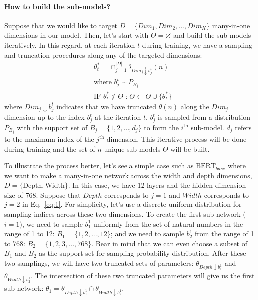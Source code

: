 \documentclass[letterpaper]{article} %
\begin{document}
\paragraph{How to build the sub-models?} Suppose that we would like to target $D = \{ Dim_1, Dim_2, ..., Dim_K\}$ many-in-one dimensions in our model. Then, let's start with $\Theta = \varnothing$ and build the sub-models iteratively. In this regard, at each iteration $t$ during training, we have a sampling and truncation procedures along any of the targeted dimensions: 
\begin{equation}
\begin{split}
        & \theta_t^* = \cap_{j=1}^{|D|} \theta_{Dim_j\downarrow b_j^t}(n)  \\ 
        & \text{where } b_j^t \sim P_{B_j} \\ 
        &\text{IF } \theta_t^*  \notin \Theta \text{ : } \Theta \leftarrow \Theta \cup \{ \theta_t^* \} 
\end{split}
\label{eq:1}
\end{equation}
where $Dim_j\downarrow b_j^t$ indicates that we have truncated $\theta(n)$ along the $Dim_{j}$ dimension up to the index $b_j^t$ at the iteration $t$. $b_j^t$ is sampled from a distribution $P_{B_j}$ with the support set of $B_j = \{1,2, ..., d_j\}$ to form the $i^{\text{th}}$ sub-model. $d_j$ refers to the maximum index of the $j^{\text{th}}$ dimension. This iterative process will be done during training and the set of $n$ unique sub-models $\Theta$ will be built.

To illustrate the process better, let's see a simple case such as $\text{BERT}_{base}$ where we want to make a many-in-one network across the width and depth dimensions, $D = \{ \text{Depth}, \text{Width} \}$. In this case, we have 12 layers and the hidden dimension size of 768. Suppose that $Depth$ corresponds to $j=1$ and $Width$ corresponds to $j=2$ in Eq.~\ref{eq:1}. For simplicity, let's use a discrete uniform distribution for sampling indices across these two dimensions. To create the first sub-network ($i=1$), we need to sample $b_1^1$ uniformly from the set of natural numbers in the range of 1 to 12: $B_1 = \{1,2,..., 12\}$; and we need to sample $b_2^1$ from the range of 1 to 768: $B_2 = \{1,2,3,..., 768\}$. Bear in mind that we can even choose a subset of $B_1$ and $B_2$ as the support set for sampling probability distribution. After these two samplings, we will have two truncated sets of parameters: $\theta_{Depth \downarrow b_1^1 }$ and $\theta_{Width \downarrow b_2^1 }$. The intersection of these two truncated parameters will give us the first sub-network:  
$\theta_1 = \theta_{Depth \downarrow b_1^1} \cap \theta_{Width \downarrow b_2^1} $.   
\end{document}
